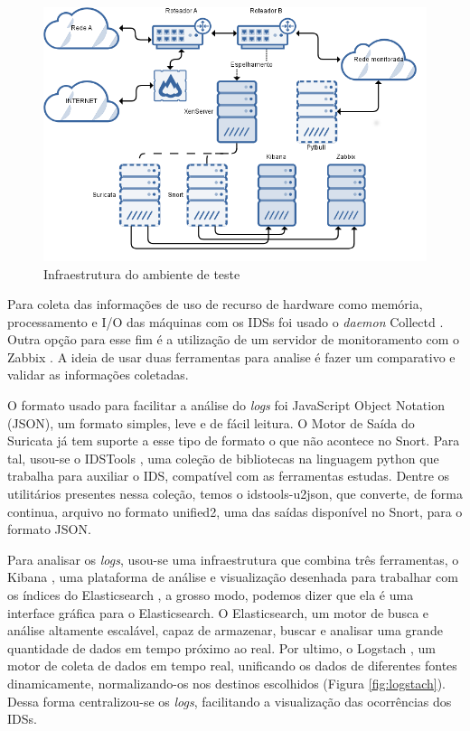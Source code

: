 \documentclass[
	12pt,				
	openright,		
	twoside,	
	a4paper,
	english,	
	brazil	
	]{abntex2}
\begin{document}
\begin{figure}[!htp]
 \centering
 \includegraphics[scale=.5]{infra.png}
 \caption{Infraestrutura do ambiente de teste}
 \label{fig:infra-ambiente}
\end{figure}

Para coleta das informações de uso de recurso de hardware como memória, processamento e I/O das máquinas com os IDSs foi usado o \textit{daemon} Collectd \cite{collectd}. Outra opção para esse fim é a utilização de um servidor de monitoramento com o Zabbix \cite{zabbix}. A ideia de usar duas ferramentas para analise é fazer um comparativo e validar as informações coletadas.

O formato usado para facilitar a análise do \textit{logs} foi JavaScript Object Notation (JSON), um formato simples, leve e de fácil leitura. O Motor de Saída do Suricata já tem suporte a esse tipo de formato o que não acontece no Snort. Para tal, usou-se o IDSTools \cite{py-idstools}, uma coleção de bibliotecas na linguagem python que trabalha para auxiliar o IDS, compatível com as ferramentas estudas. Dentre os utilitários presentes nessa coleção, temos o idstools-u2json, que converte, de forma continua, arquivo no formato unified2, uma das saídas disponível no Snort, para o formato JSON.

Para analisar os \textit{logs}, usou-se uma infraestrutura que combina três ferramentas, o Kibana \cite{kibana}, uma plataforma de análise e visualização desenhada para trabalhar com os índices do Elasticsearch \cite{elasticsearch}, a grosso modo, podemos dizer que ela é uma interface gráfica para o Elasticsearch. O Elasticsearch, um motor de busca e análise altamente escalável, capaz de armazenar, buscar e analisar uma grande quantidade de dados em tempo próximo ao real. Por ultimo, o Logstach \cite{logstach}, um motor de coleta de dados em tempo real, unificando os dados de diferentes fontes dinamicamente, normalizando-os nos destinos escolhidos (Figura \ref{fig:logstach}). Dessa forma centralizou-se os \textit{logs}, facilitando a visualização das ocorrências dos IDSs. 
\end{document}
